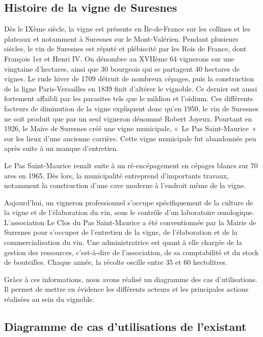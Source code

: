 \documentclass[a4paper, titlepage]{report}
\begin{document}
\subsection{Histoire de la vigne de Suresnes}

Dès le IXème siècle, la vigne est présente en Île-de-France sur les
collines et les plateaux et notamment à Suresnes sur le Mont-Valérien.
Pendant plusieurs siècles, le vin de Suresnes est réputé et plébiscité
par les Rois de France, dont François 1er et Henri IV. On dénombre au
XVIIème 64 vignerons sur une vingtaine d'hectares, ainsi que 30
bourgeois qui se partagent 40 hectares de vignes. Le rude hiver de 1709
détruit de nombreux cépages, puis la construction de la ligne
Paris-Versailles en 1839 finit d'altérer le vignoble. Ce dernier est
aussi fortement affaibli par les parasites tels que le mildiou et
l'oïdium. Ces différents facteurs de diminution de la vigne expliquent
donc qu'en 1950, le vin de Suresnes ne soit produit que par un seul
vigneron dénommé Robert Joyeux. Pourtant en 1926, le Maire de Suresnes
créé une vigne municipale, «~Le Pas Saint-Maurice~» sur les lieux d'une
ancienne carrière. Cette vigne municipale fut abandonnée peu après suite
à un manque d'entretien.

Le Pas Saint-Maurice renaît suite à un ré-encépagement en cépages blancs
sur 70 ares en 1965. Dès lors, la municipalité entreprend d'importants
travaux, notamment la construction d'une cave moderne à l'endroit même
de la vigne.

Aujourd'hui, un vigneron professionnel s'occupe spécifiquement de la
culture de la vigne et de l'élaboration du vin, sous le contrôle d'un
laboratoire œnologique. L'association Le Clos du Pas Saint-Maurice a été
conventionnée par la Mairie de Suresnes pour s'occuper de l'entretien de
la vigne, de l'élaboration et de la commercialisation du vin. Une
administratrice est quant à elle chargée de la gestion des ressources,
c'est-à-dire de l'association, de sa comptabilité et du stock de
bouteilles. Chaque année, la récolte oscille entre 35 et 60 hectolitres.

Grâce à ces informations, nous avons réalisé un diagramme des cas
d'utilisations. Il permet de mettre en évidence les différents acteurs
et les principales actions réalisées au sein du vignoble.

\clearpage
\subsection{Diagramme de cas d'utilisations de l'existant}
\end{document}
